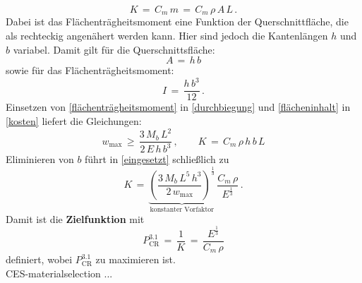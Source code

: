 \begin{equation} \label{kosten}
	K\,=\,C_m\,m\,=\,C_m\,\rho\,A\,L\,.
\end{equation}
Dabei ist das Flächenträgheitsmoment eine Funktion der Querschnittfläche, die als rechteckig angenähert werden kann. Hier sind jedoch die Kantenlängen $h$ und $b$ variabel. Damit gilt für die Querschnittsfläche:
\begin{equation} \label{flächeninhalt}
A\,=\,h\,b
\end{equation}
sowie für das Flächenträgheitsmoment:
\begin{equation} \label{flächenträgheitsmoment}
I\,=\,\frac{h\,b^3}{12}\,.
\end{equation}
Einsetzen von \ref{flächenträgheitsmoment} in \ref{durchbiegung} und \ref{flächeninhalt} in \ref{kosten} liefert die Gleichungen:
\begin{equation} \label{eingesetzt}
	w_{\text{max}}\,\ge\,\frac{3\,M_b \,L^2}{2\,E\,h\,b^3}\,, \qquad
	K\,=\,C_m\,\rho\,h\,b\,L
\end{equation}
Eliminieren von $b$ führt in \ref{eingesetzt} schließlich zu
\begin{equation}\label{performance}
K\,=\,\underbrace{\left(\frac{3\,M_b\,L^5\,h^3}{2\,w_{\text{max}}}\right)^{\frac{1}{3}}}_{\text{konstanter Vorfaktor}}\,\frac{C_m\,\rho}{E^{\frac{1}{3}}}\,.
\end{equation}
Damit ist die \textbf{Zielfunktion} mit
\begin{equation} \label{zielfkt1}
P_{\text{CR}}^{3.1}\,=\,\frac{1}{K}\,=\,\frac{E^\frac{1}{3}}{C_m\,\rho}
\end{equation}
definiert, wobei $P_{\text{CR}}^{3.1}$ zu maximieren ist.\\
CES-materialselection ...

